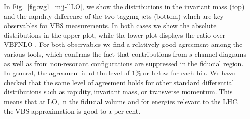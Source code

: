 In Fig.~\ref{fig:wg1_mjj-llLO}, we show the distributions in the invariant mass (top) and the rapidity difference of the two tagging jets (bottom) which are key observables for VBS measurements.
In both cases we show the absolute distributions in the upper plot, while the lower plot displays the ratio over {\sc VBFNLO} .
For both observables we find a relatively good agreement among the various tools, which confirms the fact that contributions from $s$-channel diagrams as well as from non-resonant configurations are suppressed in the fiducial region.
In general, the agreement is at the level of $1\%$ or below for each bin.
We have checked that the same level of agreement holds for other standard differential distributions such as rapidity, invariant mass, or transverse momentum.
This means that at LO, in the fiducial volume and for energies relevant to the LHC, the VBS approximation is good to a per cent.

